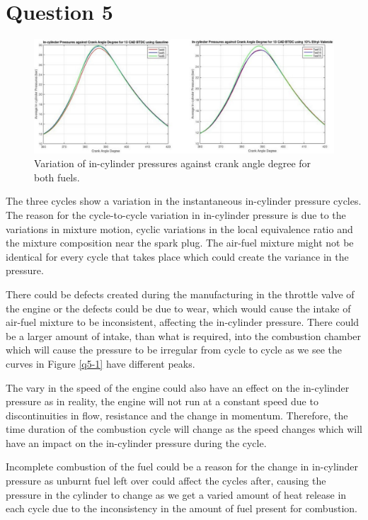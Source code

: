 \documentclass[11pt]{article}
\begin{document}
\section{Question 5}
\begin{figure}[H]
    \centering
    \includegraphics[width = \textwidth]{./img/diagram3.png}
    \caption{Variation of in-cylinder pressures against crank angle degree for both fuels.}
    \label{q5-f1}
\end{figure}
The three cycles show a variation in the instantaneous in-cylinder pressure cycles. The reason for the cycle-to-cycle variation in in-cylinder pressure is due to the variations in mixture motion, cyclic variations in the local equivalence ratio and the mixture composition near the spark plug. The air-fuel mixture might not be identical for every cycle that takes place which could create the variance in the pressure.  

There could be defects created during the manufacturing in the throttle valve of the engine or the defects could be due to wear, which would cause the intake of air-fuel mixture to be inconsistent, affecting the in-cylinder pressure. There could be a larger amount of intake, than what is required, into the combustion chamber which will cause the pressure to be irregular from cycle to cycle as we see the curves in Figure \ref{q5-1} have different peaks. 

The vary in the speed of the engine could also have an effect on the in-cylinder pressure as in reality, the engine will not run at a constant speed due to discontinuities in flow, resistance and the change in momentum. Therefore, the time duration of the combustion cycle will change as the speed changes which will have an impact on the in-cylinder pressure during the cycle.  

Incomplete combustion of the fuel could be a reason for the change in in-cylinder pressure as unburnt fuel left over could affect the cycles after, causing the pressure in the cylinder to change as we get a varied amount of heat release in each cycle due to the inconsistency in the amount of fuel present for combustion. 
\end{document}
